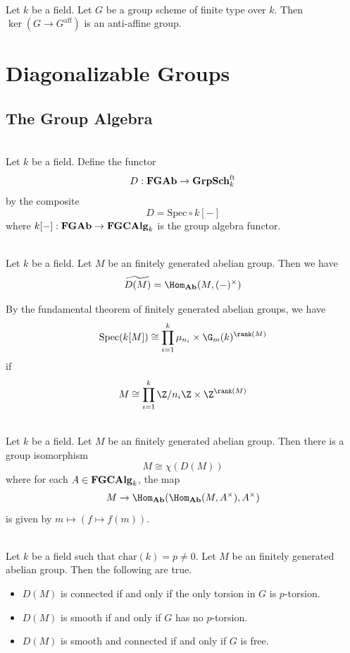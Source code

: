 \documentclass[a4paper]{article}
\begin{document}
\begin{prp}{}{}\\
Let $k$ be a field. Let $G$ be a group scheme of finite type over $k$. Then $\ker(G\to G^\text{aff})$ is an anti-affine group. 
\end{prp}

\pagebreak
\section{Diagonalizable Groups}
\subsection{The Group Algebra}
\begin{defn}{}{}\\
Let $k$ be a field. Define the functor $$D:\bold{FGAb}\to\bold{GrpSch}_k^\text{ft}$$ by the composite $$D=\text{Spec}\circ k[-]$$ where $k[-]:\bold{FGAb}\to\bold{FGCAlg}_k$ is the group algebra functor. 
\end{defn}

\begin{lmm}{}{}\\
Let $k$ be a field. Let $M$ be an finitely generated abelian group. Then we have $$\widetilde{D(M)}=\Hom_\bold{Ab}(M,(-)^\times)$$
\end{lmm}

By the fundamental theorem of finitely generated abelian groups, we have $$\text{Spec}(k[M])\cong\prod_{i=1}^k\mu_{n_i}\times\G_m(k)^{\rank(M)}$$ if $$M\cong\prod_{i=1}^k\Z/n_i\Z\times\Z^{\rank(M)}$$

\begin{lmm}{}{}\\
Let $k$ be a field. Let $M$ be an finitely generated abelian group. Then there is a group isomorphism $$M\cong\chi(D(M))$$ where for each $A\in\bold{FGCAlg}_k$, the map $$M\to\Hom_\bold{Ab}(\Hom_\bold{Ab}(M,A^\times),A^\times)$$ is given by $m\mapsto(f\mapsto f(m))$. 
\end{lmm}

\begin{prp}{}{}\\
Let $k$ be a field such that $\text{char}(k)=p\neq 0$. Let $M$ be an finitely generated abelian group. Then the following are true. 
\begin{itemize}
\item $D(M)$ is connected if and only if the only torsion in $G$ is $p$-torsion. 
\item $D(M)$ is smooth if and only if $G$ has no $p$-torsion. 
\item $D(M)$ is smooth and connected if and only if $G$ is free. 
\end{itemize}
\end{prp}
\end{document}
